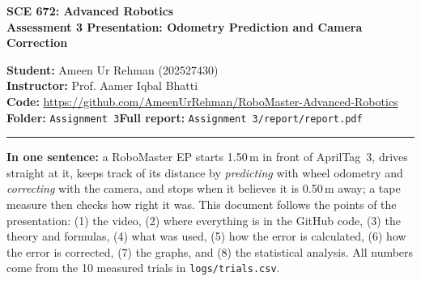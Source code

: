 \documentclass[11pt,a4paper]{article}
\begin{document}
\begin{center}
{\LARGE\bfseries SCE 672: Advanced Robotics}\\[5pt]
{\large\bfseries Assessment 3 Presentation: Odometry Prediction and Camera Correction}
\end{center}
\noindent\textbf{Student:} Ameen Ur Rehman (202527430)\\
\textbf{Instructor:} Prof. Aamer Iqbal Bhatti\\
\textbf{Code:} \url{https://github.com/AmeenUrRehman/RoboMaster-Advanced-Robotics}\\
\textbf{Folder:} \texttt{Assignment 3}\qquad \textbf{Full report:} \texttt{Assignment 3/report/report.pdf}
\par\vspace{2pt}\noindent\rule{\linewidth}{0.8pt}

\textbf{In one sentence:} a RoboMaster EP starts 1.50\,m in front of AprilTag~3, drives straight at it, keeps track of its distance by \emph{predicting} with wheel odometry and \emph{correcting} with the camera, and stops when it believes it is 0.50\,m away; a tape measure then checks how right it was.
This document follows the points of the presentation: (1) the video, (2) where everything is in the GitHub code, (3) the theory and formulas, (4) what was used, (5) how the error is calculated, (6) how the error is corrected, (7) the graphs, and (8) the statistical analysis.
All numbers come from the 10 measured trials in \texttt{logs/trials.csv}.

\end{document}
